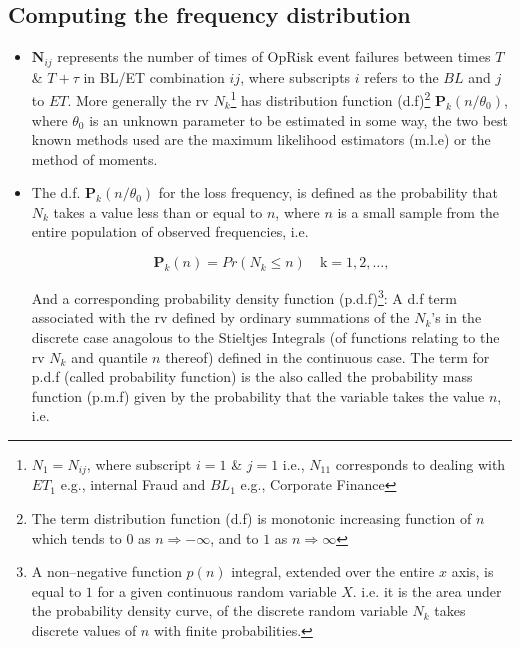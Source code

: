 \documentclass{DissertateUSU}
\begin{document}
\subsection{Computing the frequency distribution}
\label{ssec:Computing the frequency distribution}

\begin{itemize}
\item $\mathbf{N}_{ij}$ represents the number of times of OpRisk event failures between times $T$ \& $T +\tau$ in BL/ET combination $ij$, where subscripts $i$ refers to the $BL$ and $j$ to $ET$. More generally the rv $N_{k}$\footnote{$N_1 = N_{ij}$, where subscript $i=1$ \& $j=1$ i.e., $N_{11}$ corresponds to dealing with $ET_1$ e.g., internal Fraud and $BL_1$ e.g., Corporate Finance} has distribution function (d.f)\footnote{The term distribution function (d.f) is monotonic increasing function of $n$ which tends to $0$ as \begin{math} n \Longrightarrow -\infty\end{math}, and to $1$ as \begin{math} n \Longrightarrow \infty \end{math}} \begin{math}\mathbf{P}_{k}(n/\theta_0)  \end{math}, where $\theta_0$ is an unknown parameter to be estimated in some way, the two best known methods used are the maximum likelihood estimators (m.l.e) or the method of moments.\medskip

\item The d.f. \begin{math}\mathbf{P}_{k}(n/\theta_0)  \end{math} for the loss frequency, is defined as the probability that $N_{k}$ takes a value less than or equal to $n$, where $n$ is a small sample from the entire population of observed frequencies, i.e.

\singlespacing
\begin{equation}\label{PDF}
\mathbf{P}_{k}(n)=Pr \left(N_{k}\leq n \right) \quad \mbox{k} = 1, 2,\ldots,
\end{equation}
\doublespacing

And a corresponding probability density function (p.d.f)\footnote{A non--negative function $p(n)$  integral, extended over the entire $x$ axis, is equal to $1$ for a given continuous random variable $X$. i.e. it is the area under the probability density curve, of the discrete random variable $N_{k}$ takes discrete values of $n$ with finite probabilities.}: A d.f term associated with the rv defined by ordinary summations of the $N_k$'s in the discrete case anagolous to the Stieltjes Integrals (of functions relating to the rv $N_k$ and quantile $n$ thereof) defined in the continuous case. The term for p.d.f (called probability function) is the also called the probability mass function (p.m.f) given by the probability that the variable takes the value $n$, i.e.


\end{itemize}
\end{document}
